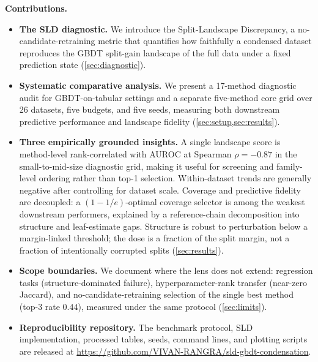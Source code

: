 \smallskip
\noindent\textbf{Contributions.}
\begin{itemize}[leftmargin=1.2em,itemsep=2pt]
  \item \textbf{The SLD diagnostic.} We introduce the Split-Landscape
    Discrepancy, a no-candidate-retraining metric that quantifies how
    faithfully a condensed dataset reproduces the GBDT split-gain landscape of
    the full data under a fixed prediction state (\cref{sec:diagnostic}).

  \item \textbf{Systematic comparative analysis.} We present a 17-method
    diagnostic audit for GBDT-on-tabular settings and a separate five-method
    core grid over 26 datasets, five budgets, and five seeds, measuring both
    downstream predictive performance and landscape fidelity
    (\cref{sec:setup,sec:results}).

  \item \textbf{Three empirically grounded insights.} A single landscape score
    is method-level rank-correlated with AUROC at Spearman $\rho = -0.87$ in
    the small-to-mid-size diagnostic grid, making it useful for screening and
    family-level ordering rather than top-1 selection. Within-dataset trends are
    generally negative after controlling for dataset scale. Coverage and predictive
    fidelity are decoupled: a $(1-1/e)$-optimal coverage selector is among the
    weakest downstream performers, explained by a reference-chain decomposition
    into structure and leaf-estimate gaps. Structure is robust to perturbation
    below a margin-linked threshold; the dose is a fraction of the split margin,
    not a fraction of intentionally corrupted splits (\cref{sec:results}).

  \item \textbf{Scope boundaries.} We document where the lens does not extend:
    regression tasks (structure-dominated failure), hyperparameter-rank
    transfer (near-zero Jaccard), and no-candidate-retraining selection of the
    single best method (top-3 rate $0.44$), measured under the same protocol
    (\cref{sec:limits}).

  \item \textbf{Reproducibility repository.} The benchmark protocol, SLD
    implementation, processed tables, seeds, command lines, and plotting scripts
    are released at
    \url{https://github.com/VIVAN-RANGRA/sld-gbdt-condensation}.
\end{itemize}
